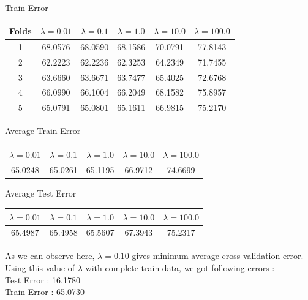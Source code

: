 \documentclass[twoside,10pt,a4paper]{article}
\theoremstyle{definition}
\theoremstyle{definition}
\theoremstyle{remark}
\renewcommand{\>}{{\rightarrow}}
\newcommand{\1}{{\mathbf 1}}
\newcommand{\0}{{\mathbf 0}}
\begin{document}
Train Error

\begin{center}
\begin{tabular}{|c| c| c | c | c | c|}
\hline
  Folds & $\lambda = 0.01$ & $\lambda = 0.1$ & $\lambda = 1.0 $ & $\lambda = 10.0$& $\lambda = 100.0$\\
\hline


1 &   68.0576 &  68.0590 &  68.1586 &  70.0791 &  77.8143 \\
\hline
2 &   62.2223 &  62.2236 &  62.3253 &  64.2349 &  71.7455 \\
\hline
3 &   63.6660 &  63.6671 &  63.7477 &  65.4025 &  72.6768 \\
\hline
4 &   66.0990 &  66.1004 &  66.2049 &  68.1582 & 75.8957 \\
\hline
5 &   65.0791 &  65.0801 &  65.1611 &  66.9815 & 75.2170 \\

\hline
\end{tabular}
\end{center}


Average Train Error

\begin{center}
\begin{tabular}{| c| c | c | c | c|}
\hline
   $\lambda = 0.01$ & $\lambda = 0.1$ & $\lambda = 1.0 $ & $\lambda = 10.0$& $\lambda = 100.0$\\
\hline
  65.0248 &  65.0261 &  65.1195 &  66.9712  & 74.6699 \\
\hline
\end{tabular}
\end{center}

Average Test Error
\begin{center}
\begin{tabular}{| c| c | c | c | c|}
\hline
   $\lambda = 0.01$ & $\lambda = 0.1$ & $\lambda = 1.0 $ & $\lambda = 10.0$& $\lambda = 100.0$\\
\hline
   65.4987 &  65.4958 &  65.5607 &  67.3943  & 75.2317 \\
\hline
\end{tabular}
\end{center}

As we can observe here, $\lambda = 0.10 $ gives minimum average cross validation error. \\
Using this value of $\lambda$ with complete train data, we got following errors : \\
Test Error :    16.1780 \\
Train Error :   65.0730 \\
\end{document}
